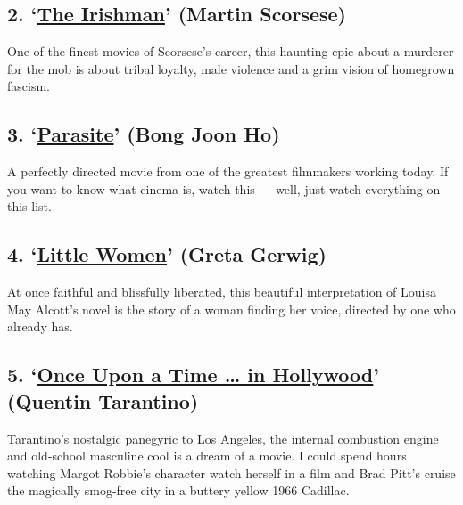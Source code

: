 \hypertarget{2-the-irishman-martin-scorsese}{%
\subsection{\texorpdfstring{2.
`\href{https://www.nytimes.com/2019/09/27/movies/the-irishman-review.html}{The
Irishman}' (Martin
Scorsese)}{2. `The Irishman' (Martin Scorsese)}}\label{2-the-irishman-martin-scorsese}}

One of the finest movies of Scorsese's career, this haunting epic about
a murderer for the mob is about tribal loyalty, male violence and a grim
vision of homegrown fascism.

\hypertarget{3-parasite-bong-joon-ho-1}{%
\subsection{\texorpdfstring{3.
`\href{https://www.nytimes.com/2019/10/10/movies/parasite-review.html}{Parasite}'
(Bong Joon
Ho)}{3. `Parasite' (Bong Joon Ho)}}\label{3-parasite-bong-joon-ho-1}}

A perfectly directed movie from one of the greatest filmmakers working
today. If you want to know what cinema is, watch this --- well, just
watch everything on this list.

\hypertarget{4-little-women-greta-gerwig}{%
\subsection{\texorpdfstring{4.
`\href{https://www.nytimes.com/2019/12/23/movies/little-women-review.html}{Little
Women}' (Greta
Gerwig)}{4. `Little Women' (Greta Gerwig)}}\label{4-little-women-greta-gerwig}}

At once faithful and blissfully liberated, this beautiful interpretation
of Louisa May Alcott's novel is the story of a woman finding her voice,
directed by one who already has.

\hypertarget{5-once-upon-a-time--in-hollywood-quentin-tarantino}{%
\subsection{\texorpdfstring{5.
`\href{https://www.nytimes.com/2019/05/22/movies/dicaprio-pitt.html?module=inline}{Once
Upon a Time \ldots{} in Hollywood}' (Quentin
Tarantino)}{5. `Once Upon a Time \ldots{} in Hollywood' (Quentin Tarantino)}}\label{5-once-upon-a-time--in-hollywood-quentin-tarantino}}

Tarantino's nostalgic panegyric to Los Angeles, the internal combustion
engine and old-school masculine cool is a dream of a movie. I could
spend hours watching Margot Robbie's character watch herself in a film
and Brad Pitt's cruise the magically smog-free city in a buttery yellow
1966 Cadillac.

